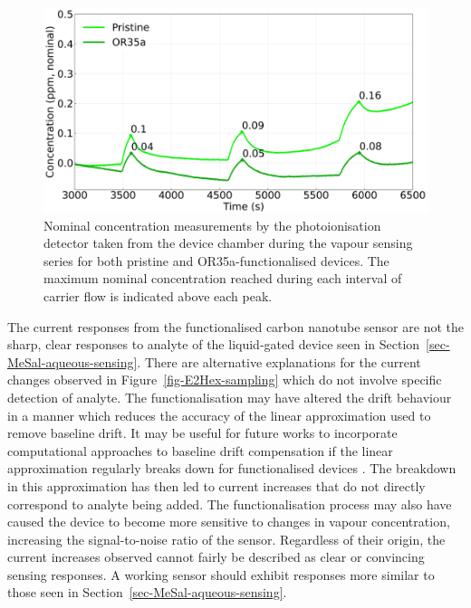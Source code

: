\documentclass[
  a4paper,
]{scrbook}
\begin{document}
\begin{figure}

{\centering \includegraphics[width=1\textwidth,height=\textheight]{figures/ch9/input_time_comparison.png}

}

\caption[Nominal concentration measurements by the photoionisation
detector taken from the device chamber during the vapour sensing series
for both pristine and OR35a-functionalised
devices.]{\label{fig-E2Hex-additions-PID}Nominal concentration
measurements by the photoionisation detector taken from the device
chamber during the vapour sensing series for both pristine and
OR35a-functionalised devices. The maximum nominal concentration reached
during each interval of carrier flow is indicated above each peak.}

\end{figure}

The current responses from the functionalised carbon nanotube sensor are
not the sharp, clear responses to analyte of the liquid-gated device
seen in Section~\ref{sec-MeSal-aqueous-sensing}. There are alternative
explanations for the current changes observed in
Figure~\ref{fig-E2Hex-sampling} which do not involve specific detection
of analyte. The functionalisation may have altered the drift behaviour
in a manner which reduces the accuracy of the linear approximation used
to remove baseline drift. It may be useful for future works to
incorporate computational approaches to baseline drift compensation if
the linear approximation regularly breaks down for functionalised
devices \autocite{Zhang2022}. The breakdown in this approximation has
then led to current increases that do not directly correspond to analyte
being added. The functionalisation process may also have caused the
device to become more sensitive to changes in vapour concentration,
increasing the signal-to-noise ratio of the sensor. Regardless of their
origin, the current increases observed cannot fairly be described as
clear or convincing sensing responses. A working sensor should exhibit
responses more similar to those seen in
Section~\ref{sec-MeSal-aqueous-sensing}.
\end{document}
